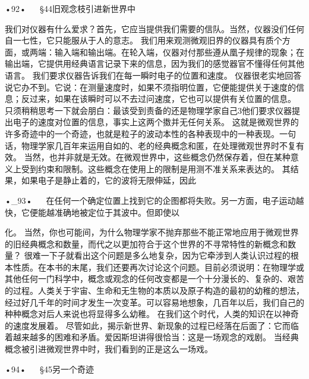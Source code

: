 •92•
  
§44旧观念枝引进新世界中

我们对仪器有什么爱求？首先，它应当提供我们需要的信队。当然，仪器没们任何自一七性，它只能服从于人的意志。
我们用来观测微观旧界的仪器具有质个方面，或两端：输入端和输出端。在轮入端，仪器对付那些遵从凰子规律的现象；在输出端，它提供用经典语言记录下来的信息，因为我们的感觉器官不懂得任何其他语言。
我们要求仪器告诉我们在每一瞬时电子的位置和速度。
仪器很老实地回答说它办不到。它说：在测量速度时，如果不须指明位置，它便能提供关于速度的信息；反过来，如果在该瞬时可以不去过问速度，它也可以提供有关位置的信息。
只须稍稍思考一下就会朋白：最该受到责备的还是物理学家自己3他们要求仪器提出电子的速度对位置的信息，事实上这两个擞并无任何关系。
这就是微观世界的许多奇迹中的一个奇迹，也就是粒子的波动本性的各种表现中的一种表现。一句话，物理学家几百年来运用自如的、老的经典概念和匿，在处理微观世界时不复有效。
当然，也并非就是无效。在微观世界中，这些概念仍然保存着，但在某种意义上受到约束和限制。这些概念在使用上的限制是用测不准关系来表达的。
其结果，如果电子是静止着的，它的波将无限伸延，因此

•_93•
  
在任何一个确定位置上找到它的企图都将失败。另一方面，电子运动越快，它便能越准确地被定位于其波中。但即使以

 

 

化。
当然，你也可能间，为什么物理学家不抛弃那些不能正常地应用于微观世界的旧经典概念和数量，而代之以更加符合于这个世界的不寻常特性的新概念和数量？
很难一下子就看出这个问题是多么地复杂，因为它牵涉到人类认识过程的根本性质。在本书的末尾，我们还要再次讨论这个问题。目前必须说明：在物理学或其他任何一门科学中，概念或观念的任何改变都是一个十分漫长的、复杂的、艰苦的过程。人类关于宇宙、生命和无生物的本质以及原子构造的最初的幼稚的想法，经过好几千年的时间才发生一次变革。可以容易地想象，几百年以后，我们自己的种种概念对后人来说也将显得多么幼稚。
在我们这个时代，人类的知识在以神奇的速度发展着。
尽管如此，揭示新世界、新现象的过程已经落在后面了：它而临着越来越多的困难和矛盾。爱因斯坦讲得很恰当：这是一场观念的戏剧。
当经典概念被引进微观世界中时，我们看到的正是这么一场戏。

•94•
  
§45另一个奇迹

